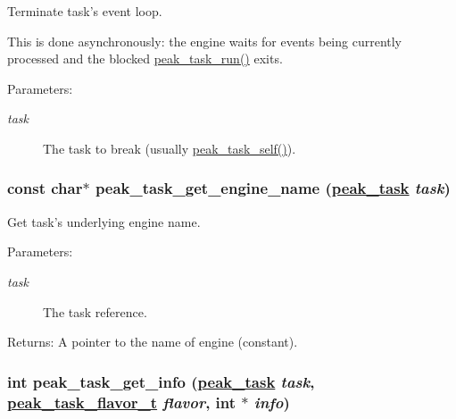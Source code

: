 Terminate task's event loop. 

This is done asynchronously: the engine waits for events being currently processed and the blocked \hyperlink{group__task__common_ga19}{peak\_\-task\_\-run()} exits.

\begin{Desc}
\item[Parameters:]
\begin{description}
\item[{\em task}]The task to break (usually \hyperlink{group__task__common_ga8}{peak\_\-task\_\-self()}). \end{description}
\end{Desc}
\hypertarget{group__task__common_ga7}{
\subsubsection[peak\_\-task\_\-get\_\-engine\_\-name]{\setlength{\rightskip}{0pt plus 5cm}const char$\ast$ peak\_\-task\_\-get\_\-engine\_\-name (\hyperlink{group__task__common_ga0}{peak\_\-task} {\em task})}}
\label{group__task__common_ga7}


Get task's underlying engine name. 

\begin{Desc}
\item[Parameters:]
\begin{description}
\item[{\em task}]The task reference.\end{description}
\end{Desc}
\begin{Desc}
\item[Returns:]A pointer to the name of engine (constant). \end{Desc}
\hypertarget{group__task__common_ga5}{
\subsubsection[peak\_\-task\_\-get\_\-info]{\setlength{\rightskip}{0pt plus 5cm}int peak\_\-task\_\-get\_\-info (\hyperlink{group__task__common_ga0}{peak\_\-task} {\em task}, \hyperlink{group__task__common_ga1}{peak\_\-task\_\-flavor\_\-t} {\em flavor}, int $\ast$ {\em info})}}
\label{group__task__common_ga5}


